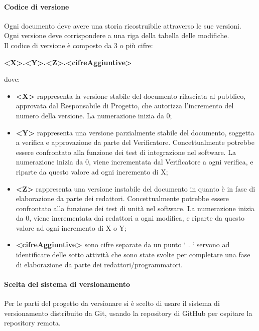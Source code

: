             \paragraph{Codice di versione}
                Ogni documento deve avere una storia ricostruibile attraverso le sue versioni.  \\
                Ogni versione deve corrispondere a una riga della tabella delle modifiche. \\
                Il codice di versione è composto da 3 o più cifre: \\
                \begin{center}
                    \textbf{<X>.<Y>.<Z>.<cifreAggiuntive>}
                \end{center}
                dove:
                \begin{itemize}
                    \item\textbf{<X>} rappresenta la versione stabile del documento rilasciata al pubblico, approvata dal Responsabile di Progetto, che autorizza l’incremento del numero della versione. La numerazione inizia da 0;
                    \item\textbf{<Y>} rappresenta una versione parzialmente stabile del documento, soggetta a verifica e approvazione da parte del Verificatore. Concettualmente potrebbe essere confrontato alla funzione dei test di integrazione nel software. La numerazione inizia da 0, viene incrementata dal Verificatore a ogni verifica, e riparte da questo valore ad ogni incremento di X;
                    \item\textbf{<Z>} rappresenta una versione instabile del documento in quanto è in fase di elaborazione da parte dei redattori. Concettualmente potrebbe essere confrontato alla funzione dei test di unità nel software. La numerazione inizia da 0, viene incrementata dai redattori a ogni modifica, e riparte da questo valore ad ogni incremento di X o Y;
                    \item\textbf{<cifreAggiuntive>} sono cifre separate da un punto ‘ . ‘ servono ad identificare delle sotto attività che sono state svolte per completare una fase di elaborazione da parte dei redattori/programmatori.
                \end{itemize}
            \paragraph{Scelta del sistema di versionamento}
                Per le parti del progetto da versionare si è scelto di usare il sistema di versionamento distribuito da Git, usando la repository di GitHub per ospitare la repository remota.
